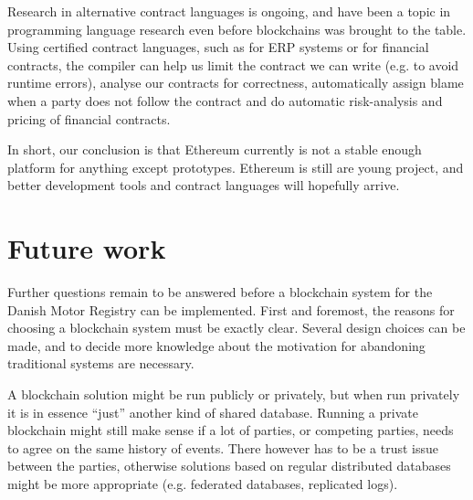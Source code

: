 \documentclass[oneside,a4paper,10pts,article]{memoir}
\begin{document}
Research in alternative contract languages is ongoing, and have been a
topic in programming language research even before blockchains was
brought to the table. Using certified contract languages, such as
\cite{hvitved2011contract} for ERP systems or \cite{bahr2015certified}
for financial contracts, the compiler can help us limit the contract
we can write (e.g. to avoid runtime errors), analyse our contracts for
correctness, automatically assign blame when a party does not follow
the contract and do automatic risk-analysis and pricing of financial
contracts.

In short, our conclusion is that Ethereum currently is not a stable
enough platform for anything except prototypes. Ethereum is still are
young project, and better development tools and contract languages
will hopefully arrive.








\chapter{Future work}
\label{sec:futurework}
Further questions remain to be answered before a blockchain system for
the Danish Motor Registry can be implemented.  First and foremost, the
reasons for choosing a blockchain system must be exactly
clear. Several design choices can be made, and to decide more
knowledge about the motivation for abandoning traditional systems are
necessary.

A blockchain solution might be run publicly or privately, but when run
privately it is in essence ``just'' another kind of shared
database. Running a private blockchain might still make sense if a lot
of parties, or competing parties, needs to agree on the same history
of events. There however has to be a trust issue between the parties,
otherwise solutions based on regular distributed databases might be
more appropriate (e.g. federated databases, replicated logs). 
\end{document}
